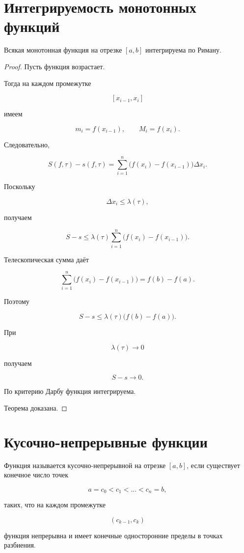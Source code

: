 \documentclass[14pt]{extreport}
\begin{document}
\section{Интегрируемость монотонных функций}

\begin{theorem}
Всякая монотонная функция на отрезке $[a,b]$
интегрируема по Риману.
\end{theorem}

\begin{proof}

Пусть функция возрастает.

Тогда на каждом промежутке

\[
[x_{i-1},x_i]
\]

имеем

\[
m_i=f(x_{i-1}),
\qquad
M_i=f(x_i).
\]

Следовательно,

\[
S(f,\tau)-s(f,\tau)
=
\sum_{i=1}^{n}
\bigl(f(x_i)-f(x_{i-1})\bigr)\Delta x_i.
\]

Поскольку

\[
\Delta x_i\le \lambda(\tau),
\]

получаем

\[
S-s
\le
\lambda(\tau)
\sum_{i=1}^{n}
\bigl(f(x_i)-f(x_{i-1})\bigr).
\]

Телескопическая сумма даёт

\[
\sum_{i=1}^{n}
\bigl(f(x_i)-f(x_{i-1})\bigr)
=
f(b)-f(a).
\]

Поэтому

\[
S-s
\le
\lambda(\tau)\bigl(f(b)-f(a)\bigr).
\]

При

\[
\lambda(\tau)\to0
\]

получаем

\[
S-s\to0.
\]

По критерию Дарбу функция интегрируема.

Теорема доказана.
\end{proof}

\section{Кусочно-непрерывные функции}

\begin{definition}
Функция называется кусочно-непрерывной на отрезке $[a,b]$,
если существует конечное число точек

\[
a=c_0<c_1<\ldots<c_n=b,
\]

таких, что на каждом промежутке

\[
(c_{k-1},c_k)
\]

функция непрерывна и имеет конечные односторонние пределы
в точках разбиения.
\end{definition}
\end{document}
